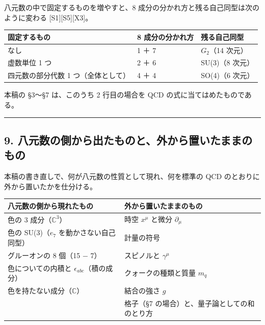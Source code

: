\documentclass[
  a4paper,
]{ltjsarticle}
\newcounter{none} %
\begin{document}
八元数の中で固定するものを増やすと、8
成分の分かれ方と残る自己同型は次のように変わる
{[}S1{]}{[}S5{]}{[}X3{]}。

{\def\LTcaptype{none} %
\begin{longtable}[]{@{}lll@{}}
\toprule\noalign{}
固定するもの & 8 成分の分かれ方 & 残る自己同型 \\
\midrule\noalign{}
\endhead
\bottomrule\noalign{}
\endlastfoot
なし & 1 ＋ 7 & \(G_2\)（14 次元） \\
虚数単位 1 つ & 2 ＋ 6 & SU(3)（8 次元） \\
四元数の部分代数 1 つ（全体として） & 4 ＋ 4 & SO(4)（6 次元） \\
\end{longtable}
}

本稿の §3〜§7 は、このうち 2 行目の場合を QCD
の式に当てはめたものである。

\begin{center}\rule{0.5\linewidth}{0.5pt}\end{center}

\subsection{9.
八元数の側から出たものと、外から置いたままのもの}\label{ux516bux5143ux6570ux306eux5074ux304bux3089ux51faux305fux3082ux306eux3068ux5916ux304bux3089ux7f6eux3044ux305fux307eux307eux306eux3082ux306e}

本稿の書き直しで、何が八元数の性質として現れ、何を標準の QCD
のとおりに外から置いたかを仕分ける。

{\def\LTcaptype{none} %
\begin{longtable}[]{@{}
  >{\raggedright\arraybackslash}p{}
  >{\raggedright\arraybackslash}p{}@{}}
\toprule\noalign{}
\begin{minipage}[b]{\linewidth}\raggedright
八元数の側から現れたもの
\end{minipage} & \begin{minipage}[b]{\linewidth}\raggedright
外から置いたままのもの
\end{minipage} \\
\midrule\noalign{}
\endhead
\bottomrule\noalign{}
\endlastfoot
色の 3 成分（\(\mathbb{C}^3\)） & 時空 \(x^\mu\) と微分
\(\partial_\mu\) \\
色の SU(3)（\(e_7\) を動かさない自己同型） & 計量の符号 \\
グルーオンの 8 個（15 − 7） & スピノルと \(\gamma^\mu\) \\
色についての内積と \(\epsilon_{abc}\)（積の成分） & クォークの種類と質量
\(m_q\) \\
色を持たない成分（\(\mathbb{C}\)） & 結合の強さ \(g\) \\
& 格子（§7 の場合）と、量子論としての和のとり方 \\
\end{longtable}
}
\end{document}
